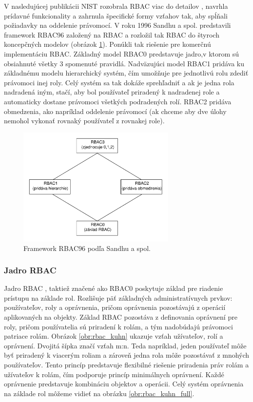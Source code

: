 V nasledujúcej publikácii \cite{NIST95} NIST rozobrala RBAC viac do detailov , navrhla prídavné funkcionality a zahrnula špecifické formy vzťahov tak, aby spĺňali požiadavky na oddelenie právomocí. V roku 1996 Sandhu a spol. \cite{sandhu96} predstavili framework RBAC96 založený na RBAC a rozložil tak RBAC do štyroch koncepčných modelov (obrázok \ref{obr:roly_rbac0_rbac1}). Ponúkli tak riešenie pre komerčnú implementáciu RBAC.
Základný model RBAC0 predstavuje jadro,v ktorom sú obsiahnuté všetky 3 spomenuté pravidlá. Nadväzujúci model RBAC1 pridáva ku základnému modelu hierarchický systém, čím umožňuje pre jednotlivú rolu zdediť právomoci inej roly. Celý systém sa tak dokáže sprehľadniť a ak je jedna rola nadradená iným, stačí, aby bol používateľ priradený k nadradenej role a automaticky dostane právomoci všetkých podradených rolí. RBAC2 pridáva obmedzenia, ako napríklad oddelenie právomocí (ak chceme aby dve úlohy nemohol vykonať rovnaký používateľ z rovnakej role). 

\begin{figure}[H]
	\centerline{\includegraphics[width=0.7\textwidth]{images/rbac012}}
	\caption{Framework RBAC96 podľa Sandhu a spol. \cite{sandhu96}}
	\label{obr:roly_rbac0_rbac1}
\end{figure}



\subsubsection{Jadro RBAC}
Jadro RBAC , taktiež značené ako RBAC0 poskytuje základ pre riadenie prístupu na základe rol. Rozlišuje päť základných administratívnych prvkov: používateľov, roly a oprávnenia, pričom oprávnenia pozostávajú z operácií aplikovaných na objekty. Základ RBAC pozostáva z definovania oprávnení pre roly, pričom používatelia sú priradení k rolám, a tým nadobúdajú právomoci patriace rolám. Obrázok \ref{obr:rbac_kuhn} ukazuje vzťah užívateľov, rolí a oprávnení. Dvojitá šípka značí vzťah m:n. Teda napríklad, jeden používateľ môže byť priradený k viacerým roliam a zároveň jedna rola môže pozostávať z mnohých používateľov. Tento princíp predstavuje flexibilné riešenie priradenia práv rolám a užívateľov k rolám, čím podporuje princíp minimálnych oprávnení. Každé oprávnenie predstavuje kombináciu objektov a operácii. Celý systém oprávnenia na základe rol môžeme vidieť na obrázku \ref{obr:rbac_kuhn_full}.



